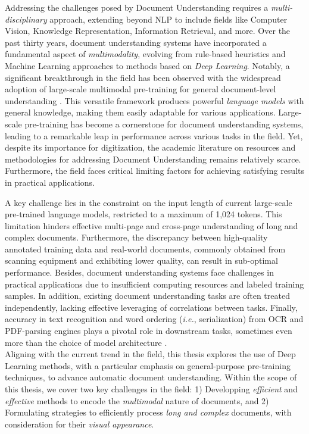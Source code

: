 Addressing the challenges posed by Document Understanding requires a \textit{multi-disciplinary} approach, extending beyond \ac{NLP} to include fields like Computer Vision, Knowledge Representation, Information Retrieval, and more. Over the past thirty years, document understanding systems have incorporated a fundamental aspect of \textit{multimodality}, evolving from rule-based heuristics and Machine Learning approaches to methods based on \textit{Deep Learning}. Notably, a significant breakthrough in the field has been observed with the widespread adoption of large-scale multimodal pre-training for general document-level understanding \citep{vaswani2017attention, xu2020layoutlm}. This versatile framework produces powerful \textit{language models} with general knowledge, making them easily adaptable for various applications. Large-scale pre-training has become a cornerstone for document understanding systems, leading to a remarkable leap in performance across various tasks in the field. Yet, despite its importance for digitization, the academic literature on resources and methodologies for addressing Document Understanding remains relatively scarce. Furthermore, the field faces critical limiting factors for achieving satisfying results in practical applications. 

A key challenge lies in the constraint on the input length of current large-scale pre-trained language models, restricted to a maximum of 1,024 tokens. This limitation hinders effective multi-page and cross-page understanding of long and complex documents. Furthermore, the discrepancy between high-quality annotated training data and real-world documents, commonly obtained from scanning equipment and exhibiting lower quality, can result in sub-optimal performance. Besides, document understanding systems face challenges in practical applications due to insufficient computing resources and labeled training samples. In addition, existing document understanding tasks are often treated independently, lacking effective leveraging of correlations between tasks. Finally, accuracy in text recognition and word ordering (\textit{i.e.}, serialization) from \ac{OCR} and PDF-parsing engines plays a pivotal role in downstream tasks, sometimes even more than the choice of model architecture \citep{borchmann2021due}. \\

Aligning with the current trend in the field, this thesis explores the use of Deep Learning methods, with a particular emphasis on general-purpose pre-training techniques, to advance automatic document understanding. Within the scope of this thesis, we cover two key challenges in the field: 1) Developping \textit{efficient} and \textit{effective} methods to encode the \textit{multimodal} nature of documents, and 2) Formulating strategies to efficiently process \textit{long and complex} documents, with consideration for their \textit{visual appearance}.

